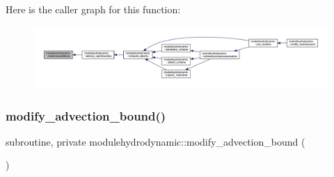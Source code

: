 Here is the caller graph for this function\+:\nopagebreak
\begin{figure}[H]
\begin{center}
\leavevmode
\includegraphics[width=350pt]{namespacemodulehydrodynamic_ab4a3acec600d04e2afbf5acc7f68b642_icgraph}
\end{center}
\end{figure}
\mbox{\label{namespacemodulehydrodynamic_a07085db86ddaf25769704243d0003e91}} 
\subsubsection{\texorpdfstring{modify\+\_\+advection\+\_\+bound()}{modify\_advection\_bound()}}
{\footnotesize\ttfamily subroutine, private modulehydrodynamic\+::modify\+\_\+advection\+\_\+bound (\begin{DoxyParamCaption}{ }\end{DoxyParamCaption})\hspace{0.3cm}{\ttfamily [private]}}

